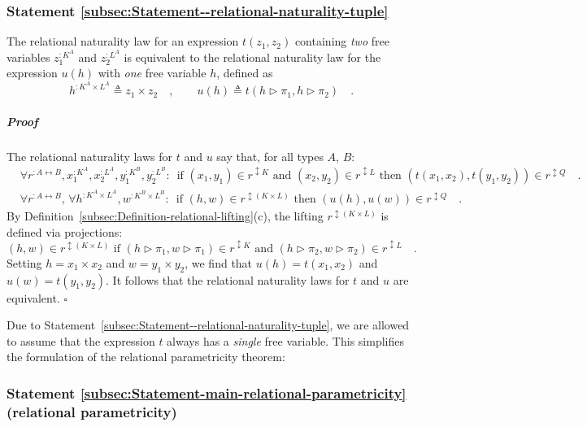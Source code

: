 \subsubsection{Statement \label{subsec:Statement--relational-naturality-tuple}\ref{subsec:Statement--relational-naturality-tuple} }

The relational naturality law for an expression $t(z_{1},z_{2})$
containing \emph{two} free variables $z_{1}^{:K^{A}}$ and $z_{2}^{:L^{A}}$
is equivalent to the relational naturality law for the expression
$u(h)$ with \emph{one} free variable $h$, defined as
\[
h^{:K^{A}\times L^{A}}\triangleq z_{1}\times z_{2}\quad,\quad\quad u(h)\triangleq t(h\triangleright\pi_{1},h\triangleright\pi_{2})\quad.
\]


\subparagraph{Proof}

The relational naturality laws for $t$ and $u$ say that, for all
types $A$, $B$:
\begin{align*}
 & \forall r^{:A\leftrightarrow B},x_{1}^{:K^{A}},x_{2}^{:L^{A}},y_{1}^{:K^{B}},y_{2}^{:L^{B}}:\,\text{ if }(x_{1},y_{1})\in r^{\updownarrow K}\text{ and }(x_{2},y_{2})\in r^{\updownarrow L}\text{ then }(t(x_{1},x_{2}),t(y_{1},y_{2}))\in r^{\updownarrow Q}\quad.\\
 & \forall r^{:A\leftrightarrow B},\,\forall h^{:K^{A}\times L^{A}},w^{:K^{B}\times L^{B}}:\,\text{ if }(h,w)\in r^{\updownarrow(K\times L)}\text{ then }(u(h),u(w))\in r^{\updownarrow Q}\quad.
\end{align*}
By Definition~\ref{subsec:Definition-relational-lifting}(c), the
lifting $r^{\updownarrow(K\times L)}$ is defined via projections:
\[
(h,w)\in r^{\updownarrow(K\times L)}\text{ if }(h\triangleright\pi_{1},w\triangleright\pi_{1})\in r^{\updownarrow K}\text{ and }(h\triangleright\pi_{2},w\triangleright\pi_{2})\in r^{\updownarrow L}\quad.
\]
Setting $h=x_{1}\times x_{2}$ and $w=y_{1}\times y_{2}$, we find
that $u(h)=t(x_{1},x_{2})$ and $u(w)=t(y_{1},y_{2})$. It follows
that the relational naturality laws for $t$ and $u$ are equivalent.
$\square$

Due to Statement~\ref{subsec:Statement--relational-naturality-tuple},
we are allowed to assume that the expression $t$ always has a \emph{single}
free variable. This simplifies the formulation of the relational parametricity
theorem:

\subsubsection{Statement \label{subsec:Statement-main-relational-parametricity}\ref{subsec:Statement-main-relational-parametricity}
(relational parametricity)}

